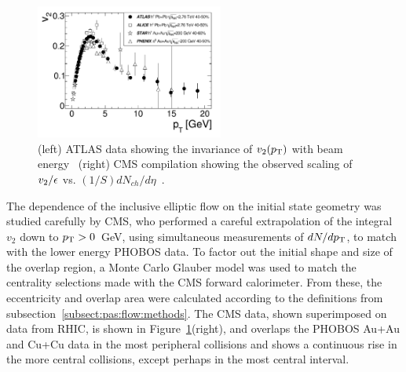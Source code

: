 \begin{figure}[!tb]
\begin{center}
\includegraphics[width=0.55\textwidth]{flowcorrelations_figs/atlas_v2_fig_06.pdf}
\caption[]{(left) ATLAS data showing the invariance of $\mbox{$v_2$}( \mbox{$p_{\mathrm{T}}$} )$
  with beam energy~\cite{ATLAS:2011ah} (right) CMS compilation showing
  the observed scaling of $\mbox{$v_2$} /\epsilon$ vs. $(1/S)
  dN_{ch}/d\eta$~\cite{Chatrchyan:2012ta}.}
\label{fig:pas:fc:scaling}
\end{center}
\end{figure}
The dependence of the inclusive elliptic flow on the initial state geometry was studied carefully by CMS, who
performed a careful extrapolation of the integral $v_2$ down to $\mbox{$p_{\mathrm{T}}$}>0$~GeV, using simultaneous measurements of
$dN/d\mbox{$p_{\mathrm{T}}$}$, to match with the lower energy PHOBOS data.
To factor out the initial shape and size of the overlap region, a Monte Carlo Glauber model was used to match
the centrality selections made with the CMS forward calorimeter.
From these, the eccentricity and overlap area were calculated according to the definitions from
subsection~\ref{subsect:pas:flow:methods}.  The CMS data, shown superimposed on data from RHIC, is shown in
Figure~\ref{fig:pas:fc:scaling}(right), and overlaps the PHOBOS Au+Au and 
Cu+Cu data in the most peripheral collisions and
shows a continuous rise in the more central collisions, except perhaps in the most central interval.


